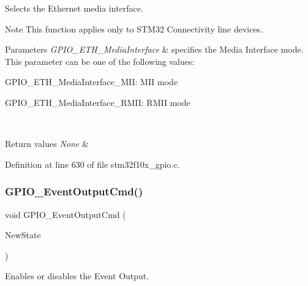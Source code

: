 Selects the Ethernet media interface. 

\begin{DoxyNote}{Note}
This function applies only to S\+T\+M32 Connectivity line devices. 
\end{DoxyNote}

\begin{DoxyParams}{Parameters}
{\em G\+P\+I\+O\+\_\+\+E\+T\+H\+\_\+\+Media\+Interface} & specifies the Media Interface mode. This parameter can be one of the following values\+: \begin{DoxyItemize}
\item G\+P\+I\+O\+\_\+\+E\+T\+H\+\_\+\+Media\+Interface\+\_\+\+M\+II\+: M\+II mode \item G\+P\+I\+O\+\_\+\+E\+T\+H\+\_\+\+Media\+Interface\+\_\+\+R\+M\+II\+: R\+M\+II mode \end{DoxyItemize}
\\
\hline
\end{DoxyParams}

\begin{DoxyRetVals}{Return values}
{\em None} & \\
\hline
\end{DoxyRetVals}


Definition at line 630 of file stm32f10x\+\_\+gpio.\+c.

\mbox{\label{group___g_p_i_o___exported___functions_gaf13ab3d59e467df44b492f1cdfe2f588}} 
\subsubsection{\texorpdfstring{G\+P\+I\+O\+\_\+\+Event\+Output\+Cmd()}{GPIO\_EventOutputCmd()}}
{\footnotesize\ttfamily void G\+P\+I\+O\+\_\+\+Event\+Output\+Cmd (\begin{DoxyParamCaption}\item[{\hyperlink{group___exported__types_gac9a7e9a35d2513ec15c3b537aaa4fba1}{Functional\+State}}]{New\+State }\end{DoxyParamCaption})}



Enables or disables the Event Output. 


